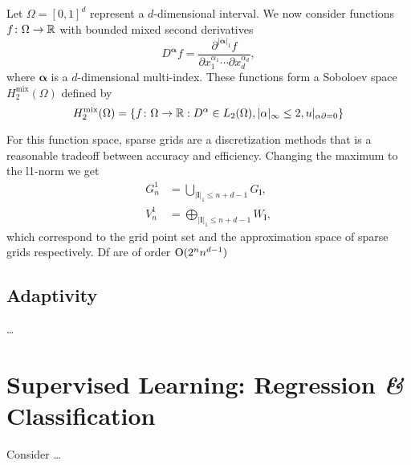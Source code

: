 Let \(\Omega = [0, 1]^d\) represent a \(d\)-dimensional interval. 
We now consider functions \(f \colon \Omega \to \mathbb{R}\) with bounded mixed second derivatives
\begin{equation*}
  D^{\bm{\alpha}} f = \frac{\partial^{\vert \bm{\alpha} \vert_1 } f}{\partial x^{\alpha_1}_1 \cdots \partial x^{\alpha_d}_d},
\end{equation*}
where \(\bm{\alpha}\) is a \(d\)-dimensional multi-index.
These functions form a Soboloev space \(H_2^\text{mix}(\Omega)\) defined by
\begin{equation*}
  H_2^\text{mix}(\Omega) = \{ f \colon \Omega \to \mathbb{R} : D^\alpha \in L_2(\Omega), \vert \alpha \vert_\infty \leq 2, u \rvert_{\alpha \partial = 0}\}
\end{equation*}

For this function space, sparse grids are a discretization methods that is a
reasonable tradeoff between accuracy and efficiency.
Changing the maximum to the l1-norm we get
\begin{align}
  G_n^1 &= \bigcup_{\vert {\bm{l}} \vert_1 \leq n + d - 1} G_{\bm{l}}, \nonumber \\
  V_n^1 &= \bigoplus_{\vert {\bm{l}} \vert_1 \leq n + d - 1} W_{\bm{l}} \label{eq:sparse-grid-space},
\end{align}
which correspond to the grid point set and the approximation space of sparse
grids respectively.
Df are of order \( \operatorname{O} (2^n n^{d-1})\)

\subsection{Adaptivity}
\ldots

\section{Supervised Learning: Regression \textit{\&} Classification}

Consider \ldots {}

